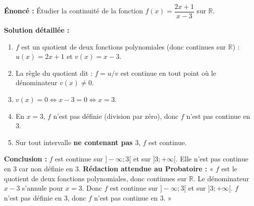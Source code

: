 \documentclass[11pt]{article}
\begin{document}
\begin{exoresolu}
\textbf{Énoncé :} Étudier la continuité de la fonction $f(x) = \dfrac{2x+1}{x-3}$ sur $\mathbb{R}$.

\textbf{Solution détaillée :}
\begin{enumerate}
    \item $f$ est un quotient de deux fonctions polynomiales (donc continues sur $\mathbb{R}$) : $u(x)=2x+1$ et $v(x)=x-3$.
    \item La règle du quotient dit : $f = u/v$ est continue en tout point où le dénominateur $v(x) \neq 0$.
    \item $v(x)=0 \iff x-3=0 \iff x=3$.
    \item En $x=3$, $f$ n'est pas définie (division par zéro), donc $f$ n'est pas continue en $3$.
    \item Sur tout intervalle \textbf{ne contenant pas $3$}, $f$ est continue.
\end{enumerate}
\textbf{Conclusion :} $f$ est continue sur $]-\infty;3[$ et sur $]3;+\infty[$. Elle n'est pas continue en $3$ car non définie en $3$.
\tcblower
\textbf{Rédaction attendue au Probatoire :}
« $f$ est le quotient de deux fonctions polynomiales, donc continues sur $\mathbb{R}$.
Le dénominateur $x-3$ s'annule pour $x=3$.
Donc $f$ est continue sur $]-\infty;3[$ et sur $]3;+\infty[$.
$f$ n'est pas définie en $3$, donc $f$ n'est pas continue en $3$. »
\end{exoresolu}
\end{document}
